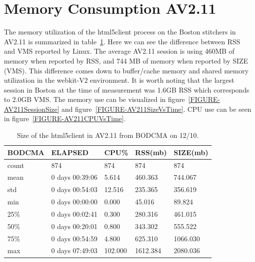 \documentclass{article}
\begin{document}
\section{Memory Consumption AV2.11}
\label{SECTION-211Memory}


The memory utilization of the html5client process on the Boston stitchers in AV2.11 is summarized in table~\ref{TABLE-AV211SessionSize}. Here we can see the difference between RSS and VMS reported by Linux. The average AV2.11 session is using 460MB of memory when reported by RSS, and 744 MB of memory when reported by SIZE (VMS). This difference comes down to buffer/cache memory and shared memory utilization in the webkit-V2 environment. It is worth noting that the largest session in Boston at the time of measurement was 1.6GB RSS which corresponds to 2.0GB VMS. The memory use can be visualized in figure~\ref{FIGURE-AV211SessionSize} and figure~\ref{FIGURE-AV211SizeVsTime}. CPU use can be seen in figure~\ref{FIGURE-AV211CPUVsTime}.



\begin{table}[H]
\begin{tabular}{|l|l|l|l|l|}
\hline BODCMA&        ELAPSED&        CPU\%&      RSS(mb)&     SIZE(mb) \\
\hline count&                     874&  874&   874&   874 \\
\hline mean&   0 days 00:39:06&    5.614&   460.363&   744.067 \\
\hline std&    0 days 00:54:03&   12.516&   235.365&   356.619 \\
\hline min&           0 days 00:00:00&    0.000&    45.016&    89.824 \\
\hline 25\%&    0 days 00:02:41&    0.300&   280.316&   461.015 \\
\hline 50\%&           0 days 00:20:01&    0.800&   343.302&   555.522 \\
\hline 75\%&    0 days 00:54:59&    4.800&   625.310&  1066.030 \\
\hline max&           0 days 07:49:03&  102.000&  1612.384&  2080.036 \\
\hline 
\end{tabular}
\caption{\label{TABLE-AV211SessionSize}Size of the html5client in AV2.11 from BODCMA on 12/10.} 
\end{table}
\end{document}

